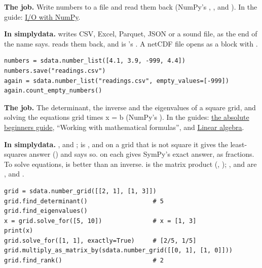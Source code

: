 \textbf{The job.} Write numbers to a file and read them back (NumPy's , ,
 and ). In the guide: \href{https://numpy.org/doc/stable/user/basics.io.html}%
{I/O with NumPy}.

\textbf{In simplydata.}  writes CSV, Excel, Parquet, JSON or a sound
file, as the end of the name says.  reads them back, and
 is 's . A netCDF file opens as a
block with .

\begin{lstlisting}[style=py]
numbers = sdata.number_list([4.1, 3.9, -999, 4.4])
numbers.save("readings.csv")
again = sdata.number_list("readings.csv", empty_values=[-999])
again.count_empty_numbers()
\end{lstlisting}


\textbf{The job.} The determinant, the inverse and the eigenvalues of a square grid, and solving the
equations grid times x = b (NumPy's ). In the guides:
\href{https://numpy.org/doc/stable/user/absolute_beginners.html}{the absolute beginners guide},
``Working with mathematical formulas'', and
\href{https://numpy.org/doc/stable/reference/routines.linalg.html}{Linear algebra}.

\textbf{In simplydata.} ,  and ;
 is , and on a grid that is not square it gives the least-squares answer
() and says so.  on each gives SymPy's exact answer, as fractions. To
solve equations,  is better than an inverse.  is the
matrix product (, ); ,  and
 are ,  and .

\begin{lstlisting}[style=py]
grid = sdata.number_grid([[2, 1], [1, 3]])
grid.find_determinant()                  # 5
grid.find_eigenvalues()
x = grid.solve_for([5, 10])              # x = [1, 3]
print(x)
grid.solve_for([1, 1], exactly=True)     # [2/5, 1/5]
grid.multiply_as_matrix_by(sdata.number_grid([[0, 1], [1, 0]]))
grid.find_rank()                         # 2
\end{lstlisting}

